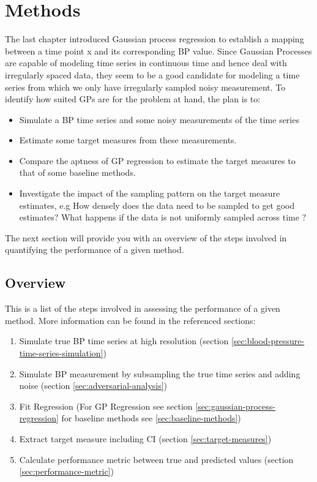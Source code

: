 \usepackage{amsmath}\chapter{Methods}\label{ch:methods}

The last chapter introduced Gaussian process regression
to establish a mapping between a time point x and its
corresponding BP value.
Since Gaussian Processes are capable of modeling time series in continuous
time and hence deal with irregularly spaced data,
they seem to be a good candidate for modeling a time series from which
we only have irregularly sampled noisy measurement.
To identify how suited GPs are for the problem at hand, the plan is to:
\begin{itemize}
    \item Simulate a BP time series and some noisy measurements of the time series
    \item Estimate some target measures from these measurements.
    \item Compare the aptness of GP regression to estimate the target measures to that of some baseline methods.
    \item Investigate the impact of the sampling pattern on the target measure estimates, e.g
    How densely does the data need to be sampled to get good estimates?
    What happens if the data is not uniformly sampled across time ?
\end{itemize}

The next section will provide you with an overview of the steps involved
in quantifying the performance of a given method.


\section{Overview}

This is a list of the steps involved in assessing the performance of a given
method. More information can be found in the referenced sections:

\begin{enumerate}
    \item Simulate true BP time series at high resolution (section \ref{sec:blood-pressure-time-series-simulation})
    \item Simulate BP measurement by subsampling the true time series and adding noise (section \ref{sec:adversarial-analysis})
    \item Fit Regression (For GP Regression see section \ref{sec:gaussian-process-regression}
    for baseline methods see \ref{sec:baseline-methods})
    \item Extract target measure including CI (section \ref{sec:target-measures})
    \item Calculate performance metric between true and predicted values (section \ref{sec:performance-metric})
\end{enumerate}


